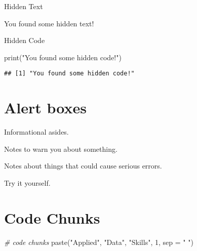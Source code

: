 \documentclass[
  oneside]{book}
\newenvironment{Shaded}{\begin{snugshade}}{\end{snugshade}}
\newcommand{\AttributeTok}[1]{\textcolor[rgb]{0.77,0.63,0.00}{#1}}
\newcommand{\CommentTok}[1]{\textcolor[rgb]{0.56,0.35,0.01}{\textit{#1}}}
\newcommand{\DecValTok}[1]{\textcolor[rgb]{0.00,0.00,0.81}{#1}}
\newcommand{\FunctionTok}[1]{\textcolor[rgb]{0.00,0.00,0.00}{#1}}
\newcommand{\NormalTok}[1]{#1}
\newcommand{\StringTok}[1]{\textcolor[rgb]{0.31,0.60,0.02}{#1}}
\begin{document}
Hidden Text

You found some hidden text!

Hidden Code

\begin{Shaded}
\begin{Highlighting}[]
\FunctionTok{print}\NormalTok{(}\StringTok{"You found some hidden code!"}\NormalTok{)}
\end{Highlighting}
\end{Shaded}

\begin{verbatim}
## [1] "You found some hidden code!"
\end{verbatim}

\hypertarget{alert-boxes}{%
\section{Alert boxes}\label{alert-boxes}}

\begin{info}
Informational asides.

\end{info}

\begin{warning}
Notes to warn you about something.

\end{warning}

\begin{dangerous}
Notes about things that could cause serious errors.

\end{dangerous}

\begin{try}
Try it yourself.

\end{try}

\hypertarget{code-chunks}{%
\section{Code Chunks}\label{code-chunks}}

\begin{Shaded}
\begin{Highlighting}[]
\CommentTok{\# code chunks}
\FunctionTok{paste}\NormalTok{(}\StringTok{"Applied"}\NormalTok{, }\StringTok{"Data"}\NormalTok{, }\StringTok{"Skills"}\NormalTok{, }\DecValTok{1}\NormalTok{, }\AttributeTok{sep =} \StringTok{" "}\NormalTok{)}
\end{Highlighting}
\end{Shaded}
\end{document}
